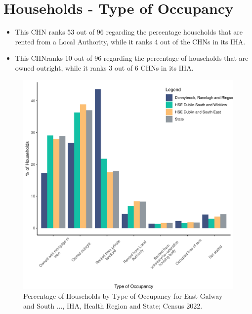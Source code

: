 \documentclass{article}
\begin{document}
\section{Households - Type of Occupancy}\label{sect:Households}
\begin{itemize}
\item This CHN ranks  53 out of 96 regarding the percentage households that are rented from a Local Authority, while it ranks  4 out of the CHNs in its IHA. 
\item This CHNranks  10 out of 96 regarding the percentage of households that are owned outright, while it ranks   3 out of 6 CHNs in its IHA.
\end{itemize}
\begin{figure}[H]
	\centering
	\includegraphics[width = 140mm]{../figures/HouseholdsED.pdf}
	\caption{Percentage of Households by Type of Occupancy for East Galway and South ..., IHA, Health Region and State; Census 2022.}
	\label{fig:vbnv}
	\end{figure}
\end{document}
